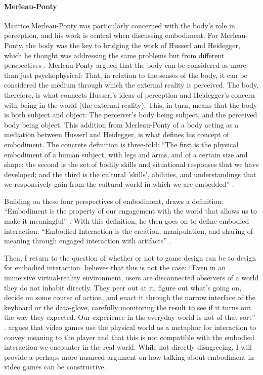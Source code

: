 \paragraph{Merleau-Ponty} Maurice Merleau-Ponty was particularly concerned with the body's role in perception, and his work is central when discussing embodiment. For Merleau-Ponty, the body was the key to bridging the work of Husserl and Heidegger, which he thought was addressing the same problems but from different perspectives \cite{ponty}. Merleau-Ponty argued that the body can be considered as more than just psychophysical: That, in relation to the senses of the body, it can be considered the medium through which the external reality is perceived. The body, therefore, is what connects Husserl's ideas of perception and Heidegger's concern with being-in-the-world (the external reality). This, in turn, means that the body is both subject and object: The perceiver's body being subject, and the perceived body being object. This addition from Merleau-Ponty of a body acting as a mediation between Husserl and Heidegger, is what defines his concept of embodiment. The concrete definition is three-fold: ``The first is the physical embodiment of a human subject, with legs and arms, and of a certain size and shape; the second is the set of bodily skills and situational responses that we have developed; and the third is the cultural 'skills', abilities, and understandings that we responsively gain from the cultural world in which we are embedded'' \cite[p. 114]{dourish}.

Building on these four perspectives of embodiment,  draws a definition: ``Embodiment is the property of our engagement with the world that allows us to make it meaningful'' \cite[p. 126]{dourish}. With this definition, he then goes on to define embodied interaction: ``Embodied Interaction is the creation, manipulation, and sharing of meaning through engaged interaction with artifacts'' \cite[p. 126]{dourish}.

Then, I return to the question of whether or not to game design can be to design for embodied interaction.  believes that this is not the case: ``Even in an immersive virtual-reality environment, users are disconnected observers of a world they do not inhabit directly. They peer out at it, figure out what’s going on, decide on some course of action, and enact it through the narrow interface of the keyboard or the data-glove, carefully monitoring the result to see if it turns out the way they expected. Our experience in the everyday world is not of that sort'' \cite[p. 102]{dourish}.  argues that video games use the physical world as a metaphor for interaction to convey meaning to the player and that this is not compatible with the embodied interaction we encounter in the real world. While not directly disagreeing, I will provide a perhaps more nuanced argument on how talking about embodiment in video games can be constructive.

